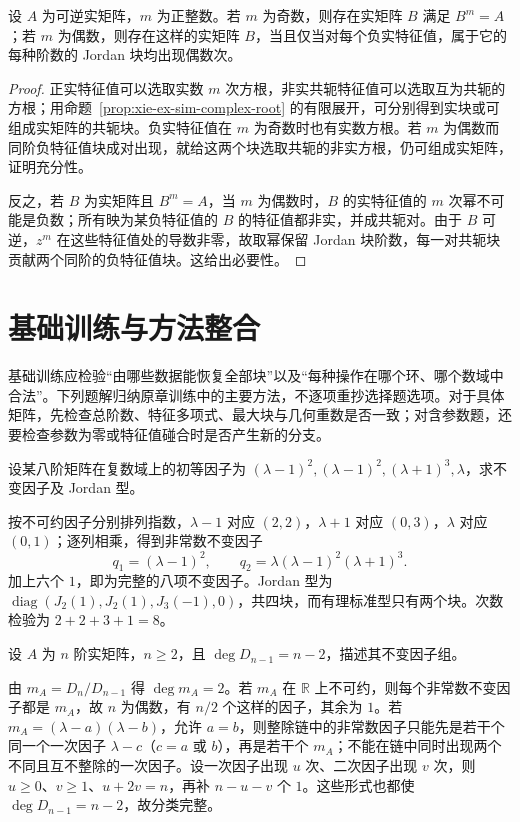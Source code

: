 \begin{proposition}
\label{prop:xie-ex-sim-real-root}
设 $A$ 为可逆实矩阵，$m$ 为正整数。若 $m$ 为奇数，则存在实矩阵 $B$ 满足 $B^m=A$；若 $m$ 为偶数，则存在这样的实矩阵 $B$，当且仅当对每个负实特征值，属于它的每种阶数的 Jordan 块均出现偶数次。
\end{proposition}
\begin{proof}
正实特征值可以选取实数 $m$ 次方根，非实共轭特征值可以选取互为共轭的方根；用命题~\ref{prop:xie-ex-sim-complex-root} 的有限展开，可分别得到实块或可组成实矩阵的共轭块。负实特征值在 $m$ 为奇数时也有实数方根。若 $m$ 为偶数而同阶负特征值块成对出现，就给这两个块选取共轭的非实方根，仍可组成实矩阵，证明充分性。

反之，若 $B$ 为实矩阵且 $B^m=A$，当 $m$ 为偶数时，$B$ 的实特征值的 $m$ 次幂不可能是负数；所有映为某负特征值的 $B$ 的特征值都非实，并成共轭对。由于 $B$ 可逆，$z^m$ 在这些特征值处的导数非零，故取幂保留 Jordan 块阶数，每一对共轭块贡献两个同阶的负特征值块。这给出必要性。
\end{proof}

\section{基础训练与方法整合}
\label{sec:xie-ex-sim-training}

基础训练应检验“由哪些数据能恢复全部块”以及“每种操作在哪个环、哪个数域中合法”。下列题解归纳原章训练中的主要方法，不逐项重抄选择题选项。对于具体矩阵，先检查总阶数、特征多项式、最大块与几何重数是否一致；对含参数题，还要检查参数为零或特征值碰合时是否产生新的分支。

\begin{example}
设某八阶矩阵在复数域上的初等因子为 $(\lambda-1)^2,(\lambda-1)^2,(\lambda+1)^3,\lambda$，求不变因子及 Jordan 型。
\end{example}
\begin{solve}
按不可约因子分别排列指数，$\lambda-1$ 对应 $(2,2)$，$\lambda+1$ 对应 $(0,3)$，$\lambda$ 对应 $(0,1)$；逐列相乘，得到非常数不变因子
\[
 q_1=(\lambda-1)^2,\qquad
 q_2=\lambda(\lambda-1)^2(\lambda+1)^3.
\]
加上六个 $1$，即为完整的八项不变因子。Jordan 型为 $\operatorname{diag}(J_2(1),J_2(1),J_3(-1),0)$，共四块，而有理标准型只有两个块。次数检验为 $2+2+3+1=8$。
\end{solve}

\begin{example}
设 $A$ 为 $n$ 阶实矩阵，$n\geq2$，且 $\deg D_{n-1}=n-2$，描述其不变因子组。
\end{example}
\begin{solve}
由 $m_A=D_n/D_{n-1}$ 得 $\deg m_A=2$。若 $m_A$ 在 $\mathbb R$ 上不可约，则每个非常数不变因子都是 $m_A$，故 $n$ 为偶数，有 $n/2$ 个这样的因子，其余为 $1$。若 $m_A=(\lambda-a)(\lambda-b)$，允许 $a=b$，则整除链中的非常数因子只能先是若干个同一个一次因子 $\lambda-c$（$c=a$ 或 $b$），再是若干个 $m_A$；不能在链中同时出现两个不同且互不整除的一次因子。设一次因子出现 $u$ 次、二次因子出现 $v$ 次，则 $u\geq0$、$v\geq1$、$u+2v=n$，再补 $n-u-v$ 个 $1$。这些形式也都使 $\deg D_{n-1}=n-2$，故分类完整。
\end{solve}

